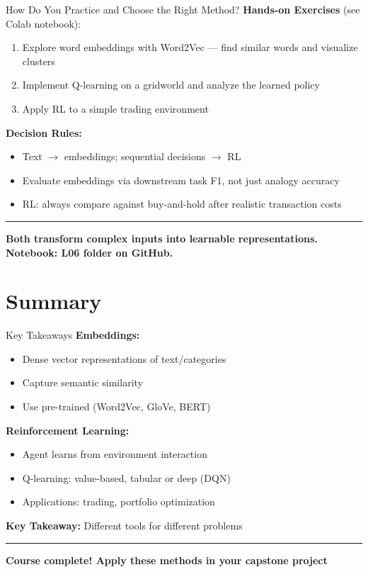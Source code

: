 \documentclass[8pt,aspectratio=169]{beamer}
\newcommand{\bottomnote}[1]{%
\vfill
\vspace{-2mm}
\textcolor{mllavender2}{\rule{\textwidth}{0.4pt}}
\vspace{1mm}
\footnotesize
\textbf{#1}
}
\newenvironment{compactlist}{%
  \begin{itemize}%
    \setlength{\itemsep}{2pt}%
    \setlength{\parskip}{0pt}%
    \setlength{\parsep}{0pt}%
}{%
  \end{itemize}%
}
\begin{document}
\begin{frame}[t]{How Do You Practice and Choose the Right Method?}
\textbf{Hands-on Exercises} (see Colab notebook):
\begin{enumerate}
  \item Explore word embeddings with Word2Vec --- find similar words and visualize clusters
  \item Implement Q-learning on a gridworld and analyze the learned policy
  \item Apply RL to a simple trading environment
\end{enumerate}
\vspace{0.3em}
\textbf{Decision Rules:}
\begin{compactlist}
  \item Text $\rightarrow$ embeddings; sequential decisions $\rightarrow$ RL
  \item Evaluate embeddings via downstream task F1, not just analogy accuracy
  \item RL: always compare against buy-and-hold after realistic transaction costs
\end{compactlist}
\bottomnote{Both transform complex inputs into learnable representations. Notebook: L06 folder on GitHub.}
\end{frame}

\section{Summary}

\begin{frame}[t]{Key Takeaways}
\textbf{Embeddings:}
\begin{itemize}
\item Dense vector representations of text/categories
\item Capture semantic similarity
\item Use pre-trained (Word2Vec, GloVe, BERT)
\end{itemize}

\textbf{Reinforcement Learning:}
\begin{itemize}
\item Agent learns from environment interaction
\item Q-learning: value-based, tabular or deep (DQN)
\item Applications: trading, portfolio optimization
\end{itemize}

\textbf{Key Takeaway:} Different tools for different problems
\bottomnote{Course complete! Apply these methods in your capstone project}
\end{frame}
\end{document}
